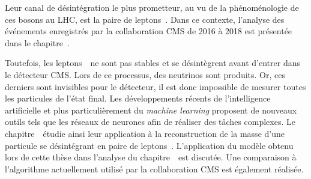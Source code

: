 Leur canal de désintégration le plus prometteur,
au vu de la phénoménologie de ces bosons au LHC,
est la paire de leptons~\tau.
Dans ce contexte,
l'analyse des événements enregistrés par la collaboration CMS de 2016 à 2018
est présentée dans le chapitre~.
\par
Toutefois,
les leptons~\tau\ ne sont pas stables
et se désintègrent avant d'entrer dans le détecteur CMS.
Lors de ce processus,
des neutrinos sont produits.
Or, ces derniers sont invisibles pour le détecteur,
il est donc impossible de mesurer toutes les particules de l'état final.
Les développements récents de l'intelligence artificielle
et plus particulièrement du \emph{machine learning}
proposent de nouveaux outils tels que les réseaux de neurones
afin de réaliser des tâches complexes.
Le chapitre~\ étudie ainsi
leur application à
la reconstruction de la masse d'une particule se désintégrant en paire de leptons~\tau.
L'application du modèle obtenu lors de cette thèse
dans l'analyse du chapitre~\ est discutée.
Une comparaison
à l'algorithme actuellement utilisé par la collaboration CMS
est également réalisée.